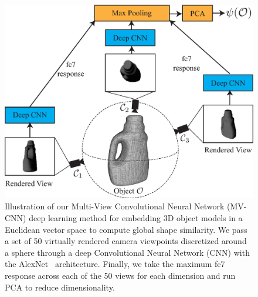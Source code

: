 \begin{figure}[t!]
\centering
\includegraphics[scale=0.275]{figures/illustrations/cnn_model.eps}
\caption{Illustration of our Multi-View Convolutional Neural Network (MV-CNN) deep learning method for embedding 3D object models in a Euclidean vector space to compute global shape similarity. We pass a set of 50 virtually rendered camera viewpoints discretized around a sphere through a deep Convolutional Neural Network (CNN) with the AlexNet~\cite{krizhevsky2012imagenet} architecture. Finally, we take the maximum fc7 response across each of the 50 views for each dimension and run PCA to reduce dimensionality.}
\vspace*{-15pt}
\end{figure}

